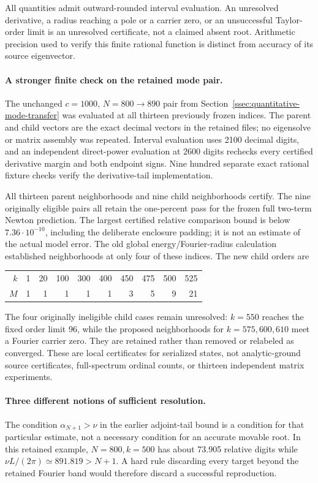 All quantities admit outward-rounded interval evaluation. An unresolved
derivative, a radius reaching a pole or a carrier zero, or an unsuccessful
Taylor-order limit is an unresolved certificate, not a claimed absent
root. Arithmetic precision used to verify this finite rational function
is distinct from accuracy of its source eigenvector.

\paragraph{A stronger finite check on the retained mode pair.}
The unchanged $c=1000$, $N=800\to890$ pair from
Section~\ref{ssec:quantitative-mode-transfer} was evaluated at all thirteen
previously frozen indices. The parent and child vectors are the exact
decimal vectors in the retained files; no eigensolve or matrix assembly
was repeated. Interval evaluation uses 2100 decimal digits, and an
independent direct-power evaluation at 2600 digits rechecks every certified
derivative margin and both endpoint signs. Nine hundred separate exact
rational fixture checks verify the derivative-tail implementation.

All thirteen parent neighborhoods and nine child neighborhoods certify.
The nine originally eligible pairs all retain the one-percent pass for
the frozen full two-term Newton prediction. The largest certified
relative comparison bound is below $7.36\cdot10^{-10}$, including the
deliberate enclosure padding; it is not an estimate of the actual model
error. The old global energy/Fourier-radius calculation established
neighborhoods at only four of these indices. The new child orders are
\begin{center}\small
\begin{tabular}{@{}rrrrrrrrrr@{}}
\toprule
$k$ & 1 & 20 & 100 & 300 & 400 & 450 & 475 & 500 & 525\\
$M$ & 1 & 1 & 1 & 1 & 1 & 3 & 5 & 9 & 21\\
\bottomrule
\end{tabular}
\end{center}
The four originally ineligible child cases remain unresolved: $k=550$
reaches the fixed order limit 96, while the proposed neighborhoods for
$k=575,600,610$ meet a Fourier carrier zero. They are retained rather
than removed or relabeled as converged. These are local certificates for
serialized states, not analytic-ground source certificates, full-spectrum
ordinal counts, or thirteen independent matrix experiments.

\paragraph{Three different notions of sufficient resolution.}
The condition $\alpha_{N+1}>\nu$ in the earlier adjoint-tail bound is a
condition for that particular estimate, not a necessary condition for an
accurate movable root. In this retained example, $N=800,k=500$ has about
73.905 relative digits while $\nu L/(2\pi)\simeq891.819>N+1$.
A hard rule discarding every target beyond the retained Fourier band
would therefore discard a successful reproduction.

